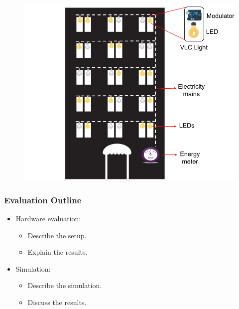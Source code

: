 \documentclass{beamer}
\begin{document}
\begin{frame}
\begin{minipage}{.5\linewidth}
\begin{itemize}
			\end{itemize}
		\end{minipage}%
		\begin{minipage}{.5\linewidth}
			\begin{figure}
				\includegraphics[width=1.05\textwidth]{design.pdf}
			\end{figure}
		\end{minipage}


		

	\end{frame}


	\begin{frame}\frametitle{Evaluation Outline}
		

		\begin{itemize}

			\item Hardware evaluation:
			\begin{itemize}

				\item Describe the setup.
				\item Explain the results.
			
			\end{itemize}

			\item Simulation:
			\begin{itemize}
				\item Describe the simulation.
				\item Discuss the results.
			\end{itemize}




		\end{itemize}
	\end{frame}
\end{document}
